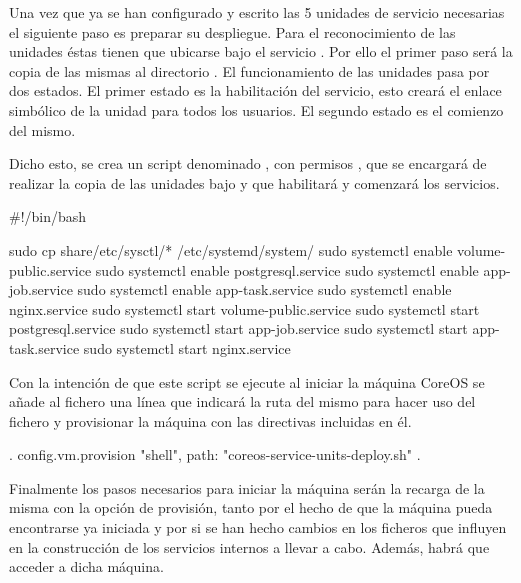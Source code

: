 Una vez que ya se han configurado y escrito las 5 unidades de servicio necesarias el siguiente paso es preparar su despliegue. Para el reconocimiento de las unidades éstas tienen que ubicarse bajo el servicio . Por ello el primer paso será la copia de las mismas al directorio . El funcionamiento de las unidades pasa por dos estados. El primer estado es la habilitación del servicio, esto creará el enlace simbólico de la unidad para todos los usuarios. El segundo estado es el comienzo del mismo.

Dicho esto, se crea un script denominado , con permisos , que se encargará de realizar la copia de las unidades bajo  y que habilitará y comenzará los servicios.

\begin{codelisting}
\label{code:coreos-service-units-deploy}
\begin{code}
#!/bin/bash

sudo cp share/etc/sysctl/* /etc/systemd/system/
sudo systemctl enable volume-public.service
sudo systemctl enable postgresql.service
sudo systemctl enable app-job.service
sudo systemctl enable app-task.service
sudo systemctl enable nginx.service
sudo systemctl start volume-public.service
sudo systemctl start postgresql.service
sudo systemctl start app-job.service
sudo systemctl start app-task.service
sudo systemctl start nginx.service
\end{code}
\end{codelisting}

Con la intención de que este script se ejecute al iniciar la máquina CoreOS se añade al fichero  una línea que indicará la ruta del mismo para hacer uso del fichero y provisionar la máquina con las directivas incluidas en él.

\begin{codelisting}
\label{code:vagrantfile3}
\begin{code}
.
config.vm.provision "shell", path: "coreos-service-units-deploy.sh"
.
\end{code}
\end{codelisting}

Finalmente los pasos necesarios para iniciar la máquina serán la recarga de la misma con la opción de provisión, tanto por el hecho de que la máquina pueda encontrarse ya iniciada y por si se han hecho cambios en los ficheros que influyen en la construcción de los servicios internos a llevar a cabo. Además, habrá que acceder a dicha máquina. 

